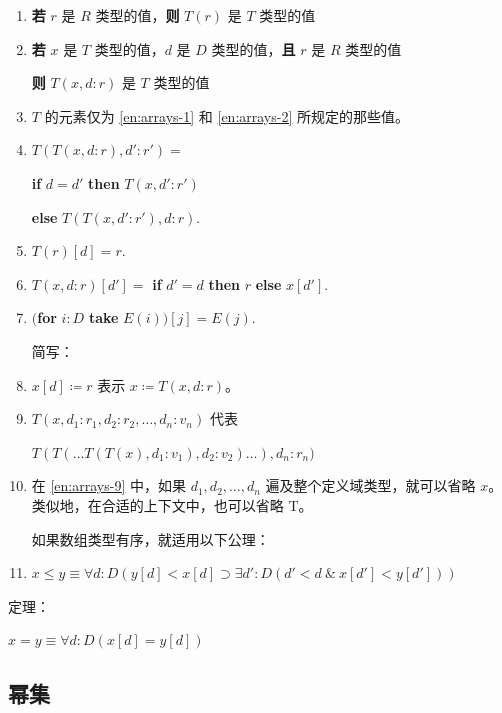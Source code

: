 \begin{enumerate}[wide, nosep, label=(\arabic*)]
	\item \label{en:arrays-1}
	\textbf{若} $r$ 是 $R$ 类型的值，\textbf{则} $T(r)$ 是 $T$ 类型的值

	\item \label{en:arrays-2}
	\textbf{若} $x$ 是 $T$ 类型的值，$d$ 是 $D$ 类型的值，\textbf{且} $r$ 是 $R$ 类型的值

	\qquad\quad \textbf{则} $T(x, d:r)$ 是 $T$ 类型的值

	\item $T$ 的元素仅为 \ref{en:arrays-1} 和 \ref{en:arrays-2} 所规定的那些值。

	\item $T(T(x, d:r), d':r') =$

	\quad \textbf{if} $d = d'$ \textbf{then} $T(x, d':r')$

	\qquad\quad\textbf{else} $T(T(x, d':r'), d:r).$

	\item $T(r)[d] = r.$

	\item $T(x, d:r)[d'] =$ \textbf{if} $d' = d$ \textbf{then} $r$ \textbf{else} $x[d'].$

	\item $($\textbf{for} $i:D$ \textbf{take} $E(i))[j] = E(j).$

	\noindent
	简写：

	\item $x[d] \coloneq r$ 表示 $x \coloneq T(x, d:r)$。

	\item\label{en:arrays-9}
	 $T(x, d_1:r_1, d_2 : r_2, \dots, d_n:v_n)$ 代表

	\quad $T(T(\dots T(T(x), d_1:v_1), d_2:v_2)\dots), d_n:r_n)$

	\item 在 \ref{en:arrays-9} 中，如果 $d_1, d_2, \dots, d_n$ 遍及整个定义域类型，就可以省略 $x$。类似地，在合适的上下文中，也可以省略 T。

如果数组类型有序，就适用以下公理：

	\item $x \leqslant y \equiv \forall d: D(y[d] < x[d] \supset \exists d':D(d' < d\ \&\ x[d'] < y[d']))$
\end{enumerate}

\noindent
定理：

$x = y \equiv \forall d:D(x[d] = y[d])$

\subsection{幂集}

